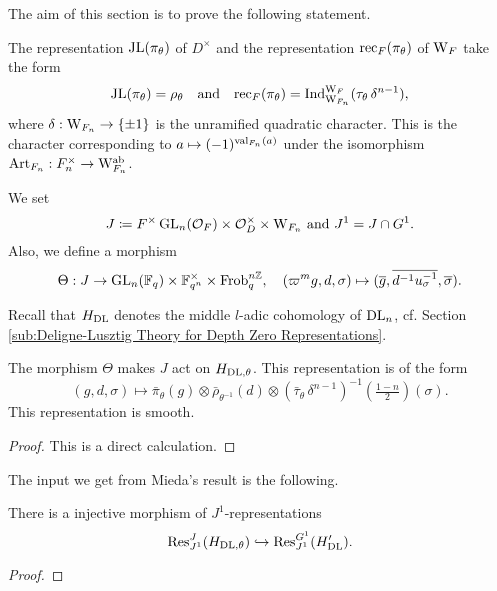 \documentclass[../main.tex]{subfiles}
\begin{document}
The aim of this section is to prove the following statement.
\begin{thm}\label{thm:MainRes1}
  The representation $\mathrm{JL}(\pi_\theta)$ of $D^\times$ and the representation
  $\mathrm{rec}_F(\pi_\theta)$ of $\mathrm W_F$ take the form
  \begin{equation*}
    \mathrm{JL}(\pi_\theta) = \rho_{\theta}
    \quad \text{and} \quad \mathrm{rec}_F(\pi_\theta) = \mathrm{Ind}_{\mathrm W_{F_n}}^{\mathrm W_F} 
    (\tau_\theta \, \delta^{n-1}),
  \end{equation*}
  where $\delta: \mathrm W_{F_n} \to \{\pm 1\}$ is the unramified quadratic
  character. This is the character corresponding to $a \mapsto
  (-1)^{\mathrm{val}_{F_n}(a)}$ under the isomorphism $\mathrm{Art}_{F_n}: F_n^\times \to
  \mathrm W_{F_n}^{\mathrm{ab}}$. 
\end{thm}

We set 
\begin{equation} \label{eq:defJandJ1}
  J \coloneqq F^\times \operatorname{GL}_n(\mathcal{O}_F) \times \mathcal{O}_D^\times \times \mathrm W_{F_n}
  \text{ and } J^1 = J \cap G^1.
\end{equation}
Also, we define a morphism 
\begin{equation*}
  \Theta: J \to \operatorname{GL}_n(\mathbb{F}_q) \times \mathbb{F}_{q^n}^\times \times {\operatorname{Frob}_q^{n\mathbb{Z}}}, \quad
  (\varpi^m g,d,\sigma) \mapsto (\overline g, \overline {d^{-1}u_\sigma^{-1}}, \overline{\sigma}).
\end{equation*}

Recall that $H_{\mathrm{DL}}$ denotes the middle $l$-adic cohomology of 
$\mathrm{DL}_n$, cf. Section \ref{sub:Deligne-Lusztig Theory for Depth Zero Representations}.
\begin{lem}
  The morphism $\Theta$ makes $J$ act on ${H}_{\mathrm{DL},\theta}$. This representation is 
  of the form 
  \begin{equation*}
    (g,d,\sigma) \mapsto \bar \pi_\theta(g) \otimes \bar \rho_{\theta^{-1}}(d)
    \otimes \left(\bar \tau_\theta \, \delta^{n-1}\right)^{-1}(\tfrac{1-n}2)(\sigma).
  \end{equation*}
  This representation is smooth.
\begin{proof}
  This is a direct calculation.
\end{proof}
\end{lem}

The input we get from Mieda's result is the following.
\begin{prop}\label{prop:J1EquivInjMor}
  There is a injective morphism of  $J^1$-representations
  \begin{equation*} 
    \mathrm{Res}_{J^1}^J( H_{\mathrm{DL},\theta} ) \hookrightarrow \mathrm{Res}_{J^1}^{G^1}( H'_{\mathrm{DL}}).
  \end{equation*}
\begin{proof}
\end{proof}
\end{prop}
\end{document}
